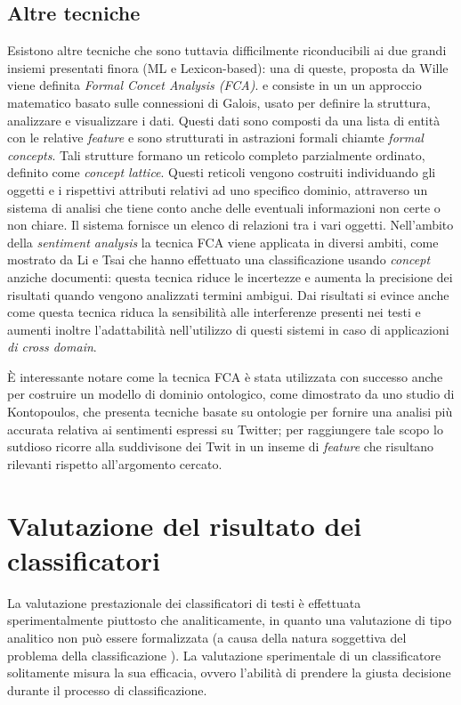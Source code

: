 \documentclass[a4paper,12pt,openright,twoside]{report}
\theoremstyle{definition}
\begin{document}
\subsection{Altre tecniche}
Esistono altre tecniche che sono tuttavia difficilmente riconducibili ai due grandi insiemi presentati finora (ML e Lexicon-based):
una di queste, proposta da Wille %
viene definita \emph{Formal Concet Analysis (FCA)}.
e consiste in un un approccio matematico basato sulle connessioni
di Galois, usato per definire la struttura, analizzare e visualizzare i dati.
Questi dati sono composti da una lista di entità con le relative \emph{feature} e sono strutturati
in astrazioni formali chiamte \emph{formal concepts}. Tali strutture formano un reticolo completo 
parzialmente ordinato, definito come \emph{concept lattice}. Questi reticoli vengono costruiti
individuando gli oggetti e i rispettivi attributi relativi ad uno specifico dominio, attraverso
un sistema di analisi che tiene conto anche delle eventuali informazioni non certe o non chiare.
Il sistema
fornisce un elenco di relazioni tra i vari oggetti.
Nell'ambito della \emph{sentiment analysis} la tecnica FCA viene applicata in diversi ambiti,
come mostrato da Li e Tsai %
che hanno effettuato una classificazione usando \emph{concept} anziche documenti: questa tecnica
riduce le incertezze e aumenta la precisione dei risultati quando vengono analizzati termini ambigui.
Dai risultati si evince anche come questa tecnica riduca la sensibilità alle interferenze presenti nei testi
e aumenti inoltre l'adattabilità nell'utilizzo di questi sistemi in caso di applicazioni \emph{di cross domain}.

\`E interessante notare come la tecnica FCA è stata utilizzata con successo
anche per costruire un modello di dominio ontologico, come dimostrato da uno
studio di Kontopoulos, %
che presenta
tecniche basate su ontologie per fornire una analisi più accurata relativa ai sentimenti espressi
su Twitter; per raggiungere tale scopo lo
sutdioso ricorre alla suddivisone dei Twit in un inseme di \emph{feature} che risultano rilevanti
rispetto all'argomento cercato.

\section{Valutazione del risultato dei classificatori}
La valutazione prestazionale dei classificatori di testi è effettuata sperimentalmente
piuttosto che analiticamente, in quanto una valutazione di tipo analitico non può essere
formalizzata (a causa della natura soggettiva del problema della classificazione ). La
valutazione sperimentale di un classificatore solitamente misura la sua efficacia, ovvero
l’abilità di prendere la giusta decisione durante il processo di classificazione.
\end{document}
